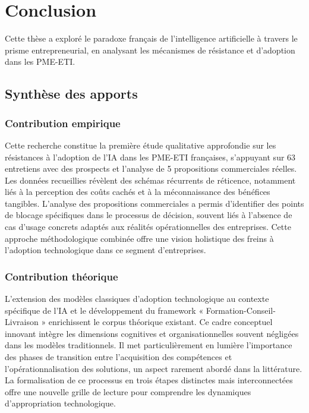 \chapter{Conclusion}
\label{chap:conclusion}

Cette thèse a exploré le paradoxe français de l’intelligence artificielle à travers le prisme entrepreneurial, en analysant les mécanismes de résistance et d’adoption dans les PME-ETI.

\section{Synthèse des apports}

\subsection{Contribution empirique}
Cette recherche constitue la première étude qualitative approfondie sur les résistances à l’adoption de l’IA dans les PME-ETI françaises, s’appuyant sur 63 entretiens avec des prospects et l’analyse de 5 propositions commerciales réelles. Les données recueillies révèlent des schémas récurrents de réticence, notamment liés à la perception des coûts cachés et à la méconnaissance des bénéfices tangibles. L'analyse des propositions commerciales a permis d'identifier des points de blocage spécifiques dans le processus de décision, souvent liés à l'absence de cas d'usage concrets adaptés aux réalités opérationnelles des entreprises. Cette approche méthodologique combinée offre une vision holistique des freins à l'adoption technologique dans ce segment d'entreprises.

\subsection{Contribution théorique}
L’extension des modèles classiques d’adoption technologique au contexte spécifique de l’IA et le développement du framework « Formation-Conseil-Livraison » enrichissent le corpus théorique existant. Ce cadre conceptuel innovant intègre les dimensions cognitives et organisationnelles souvent négligées dans les modèles traditionnels. Il met particulièrement en lumière l'importance des phases de transition entre l'acquisition des compétences et l'opérationnalisation des solutions, un aspect rarement abordé dans la littérature. La formalisation de ce processus en trois étapes distinctes mais interconnectées offre une nouvelle grille de lecture pour comprendre les dynamiques d'appropriation technologique.

